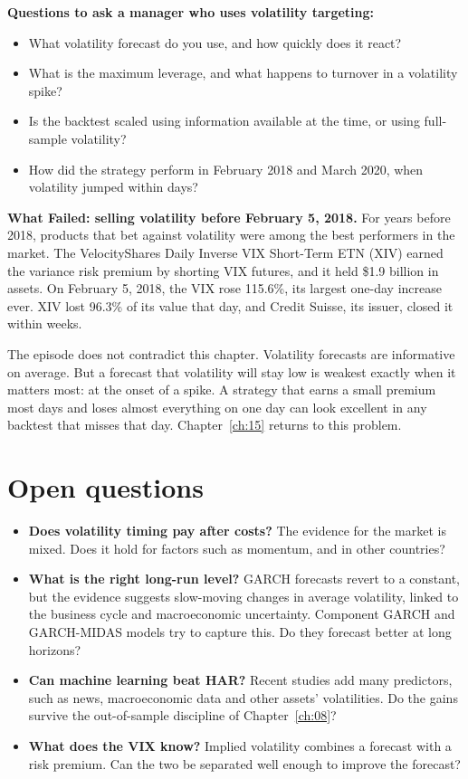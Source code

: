 \textbf{Questions to ask a manager who uses volatility targeting:}

\begin{itemize}
  \item What volatility forecast do you use, and how quickly does it react?
  \item What is the maximum leverage, and what happens to turnover in a volatility spike?
  \item Is the backtest scaled using information available at the time, or using full-sample volatility?
  \item How did the strategy perform in February 2018 and March 2020, when volatility jumped within days?
\end{itemize}

\begin{callout}
\textbf{What Failed: selling volatility before February 5, 2018.} For years before 2018, products that bet against volatility were among the best performers in the market. The VelocityShares Daily Inverse VIX Short-Term ETN (XIV) earned the variance risk premium by shorting VIX futures, and it held \$1.9 billion in assets. On February 5, 2018, the VIX rose 115.6\%, its largest one-day increase ever. XIV lost 96.3\% of its value that day, and Credit Suisse, its issuer, closed it within weeks.

The episode does not contradict this chapter. Volatility forecasts are informative on average. But a forecast that volatility will stay low is weakest exactly when it matters most: at the onset of a spike. A strategy that earns a small premium most days and loses almost everything on one day can look excellent in any backtest that misses that day. Chapter~\ref{ch:15} returns to this problem.
\end{callout}

\section{Open questions}
\label{sec:14-open}

\begin{itemize}
  \item \textbf{Does volatility timing pay after costs?} The evidence for the market is mixed. Does it hold for factors such as momentum, and in other countries?
  \item \textbf{What is the right long-run level?} GARCH forecasts revert to a constant, but the evidence suggests slow-moving changes in average volatility, linked to the business cycle and macroeconomic uncertainty. Component GARCH and GARCH-MIDAS models try to capture this. Do they forecast better at long horizons?
  \item \textbf{Can machine learning beat HAR?} Recent studies add many predictors, such as news, macroeconomic data and other assets' volatilities. Do the gains survive the out-of-sample discipline of Chapter~\ref{ch:08}?
  \item \textbf{What does the VIX know?} Implied volatility combines a forecast with a risk premium. Can the two be separated well enough to improve the forecast?
\end{itemize}

